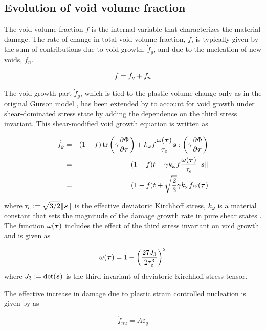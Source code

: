 \subsection{Evolution of void volume fraction}
The void volume fraction $f$ is the internal variable that characterizes the material damage. The rate of change in total void volume fraction, $\dot{f}$, is typically given by the sum of contributions due to void growth, $\dot{f}_g$, and due to the nucleation of new voids, $\dot{f}_{n}$.

\begin{equation}\label{eq:dotf}
\dot{f} = \dot{f}_g + \dot{f}_{n}\\
\end{equation}

The void growth part $\dot{f}_g$, which is tied to the plastic volume change only as in the original Gurson model \cite{Gurson1977}, has been extended by \cite{Nahshon2008} to account for void growth under shear-dominated stress state by adding the dependence on the third stress invariant. This shear-modified void growth equation is written as

\begin{eqnarray}
\dot{f}_g &=& (1-f)\operatorname{\text{tr}}\left( \gamma\frac{\partial\Phi}{\partial{\boldsymbol{\tau}}} \right) + k_{\omega}f\frac{\omega({\boldsymbol{\tau}})}{\tau_e}{\boldsymbol{s}}: \left( \gamma\frac{\partial\Phi}{\partial{\boldsymbol{\tau}}} \right)\\
&=&(1-f)t + \gamma k_{\omega}f\frac{\omega({\boldsymbol{\tau}})}{\tau_e} \|{\boldsymbol{s}}\| \\
&=&(1-f)t + \sqrt{\frac{2}{3}}\gamma k_{\omega}f \omega({\boldsymbol{\tau}})
\end{eqnarray}

where $\tau_e:=\sqrt{3/2}\|{\boldsymbol{s}}\|$ is the effective deviatoric Kirchhoff stress, $k_{\omega}$ is a material constant that sets the magnitude of the damage growth rate in pure shear states \cite{Nahshon2008}. The function $\omega({\boldsymbol{\tau}})$ includes the effect of the third stress invariant on void growth and is given as

\begin{equation}
\omega({\boldsymbol{\tau}}) = 1- \left(\frac{27J_3}{2\tau_e^3}\right)^2
\end{equation}
where $J_3:=\det({\boldsymbol{s}})$ is the third invariant of deviatoric Kirchhoff stress tensor.

The effective increase in damage due to plastic strain controlled nucleation is given by\cite{Chu1980} as

\begin{equation}\label{eq:dotf_nu}
\dot{f}_{nu} = A \dot{\varepsilon}_q
\end{equation}

